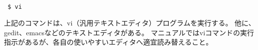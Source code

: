 \\


\begin{verbatim}
 $ vi
\end{verbatim}

上記のコマンドは、vi（汎用テキストエディタ）プログラムを実行する。
他に、gedit、emacsなどのテキストエディタがある。
マニュアルではviコマンドの実行指示があるが、各自の使いやすいエディタへ適宜読み替えること。


